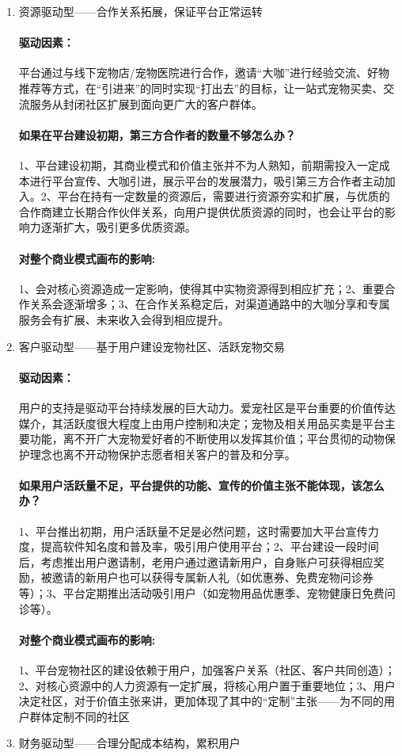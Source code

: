 \documentclass[a4paper]{ctexart}
\begin{document}
\begin{enumerate}[label=\alph*.]
  \item 资源驱动型——合作关系拓展，保证平台正常运转 
  \paragraph{驱动因素：}平台通过与线下宠物店/宠物医院进行合作，邀请“大咖”进行经验交流、好物推荐等方式，在“引进来”的同时实现“打出去”的目标，让一站式宠物买卖、交流服务从封闭社区扩展到面向更广大的客户群体。
  \paragraph{如果在平台建设初期，第三方合作者的数量不够怎么办？}1、平台建设初期，其商业模式和价值主张并不为人熟知，前期需投入一定成本进行平台宣传、大咖引进，展示平台的发展潜力，吸引第三方合作者主动加入。2、平台在持有一定数量的资源后，需要进行资源夯实和扩展，与优质的合作商建立长期合作伙伴关系，向用户提供优质资源的同时，也会让平台的影响力逐渐扩大，吸引更多优质资源。
  \paragraph{对整个商业模式画布的影响:}1、会对核心资源造成一定影响，使得其中实物资源得到相应扩充；2、重要合作关系会逐渐增多；3、在合作关系稳定后，对渠道通路中的大咖分享和专属服务会有扩展、未来收入会得到相应提升。
  \item 客户驱动型——基于用户建设宠物社区、活跃宠物交易 
  \paragraph{驱动因素：}用户的支持是驱动平台持续发展的巨大动力。爱宠社区是平台重要的价值传达媒介，其活跃度很大程度上由用户控制和决定；宠物及相关用品买卖是平台主要功能，离不开广大宠物爱好者的不断使用以发挥其价值；平台贯彻的动物保护理念也离不开动物保护志愿者相关客户的普及和分享。
  \paragraph{如果用户活跃量不足，平台提供的功能、宣传的价值主张不能体现，该怎么办？}1、平台推出初期，用户活跃量不足是必然问题，这时需要加大平台宣传力度，提高软件知名度和普及率，吸引用户使用平台；2、平台建设一段时间后，考虑推出用户邀请制，老用户通过邀请新用户，自身账户可获得相应奖励，被邀请的新用户也可以获得专属新人礼（如优惠券、免费宠物问诊券等）；3、平台定期推出活动吸引用户（如宠物用品优惠季、宠物健康日免费问诊等）。
  \paragraph{对整个商业模式画布的影响:}1、平台宠物社区的建设依赖于用户，加强客户关系（社区、客户共同创造）；2、对核心资源中的人力资源有一定扩展，将核心用户置于重要地位；3、用户决定社区，对于价值主张来讲，更加体现了其中的“定制”主张——为不同的用户群体定制不同的社区
  \item 财务驱动型——合理分配成本结构，累积用户 

\end{enumerate}
\end{document}
